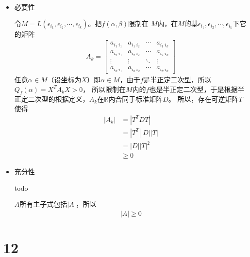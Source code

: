 \documentclass{article}
\begin{document}
\begin{itemize}
  \item 必要性

        令$M = L(\epsilon_{i_1}, \epsilon_{i_2}, \cdots, \epsilon_{i_k})$。把$f(\alpha, \beta)$限制在
        $M$内，在$M$的基$\epsilon_{i_1}, \epsilon_{i_2}, \cdots, \epsilon_{i_k}$下它的矩阵
        \begin{align}
          A_k = \begin{bmatrix}
                  a_{i_1 \ i_1} & a_{i_1 \ i_2} & \cdots & a_{i_1 \ i_k} \\
                  a_{i_2 \ i_1} & a_{i_2 \ i_2} & \cdots & a_{i_2 \ i_k} \\
                  \vdots        & \vdots        & \ddots & \vdots        \\
                  a_{i_k \ i_1} & a_{i_k \ i_2} & \cdots & a_{i_k \ i_k}
                \end{bmatrix}
        \end{align}
        任意$\alpha \in M$（设坐标为$X$）即$\alpha \in M$，由于$f$是半正定二次型，所以$Q_f(\alpha) = X^T A_k X > 0$，
        所以限制在$M$内的$f$也是半正定二次型，于是根据半正定二次型的根据定义，$A_k$在$\mathbb{R}$内合同于标准矩阵$D$。
        所以，存在可逆矩阵$T$使得
        \begin{align}
          |A_k| & = |T^T D T|     \\
                & = |T^T| |D| |T| \\
                & = |D| |T|^2     \\
                & \geq 0
        \end{align}

  \item 充分性

        todo

        $A$所有主子式包括$|A|$，所以
        \begin{align*}
          |A| \geq 0
        \end{align*}

\end{itemize}

\section*{12}
\end{document}
